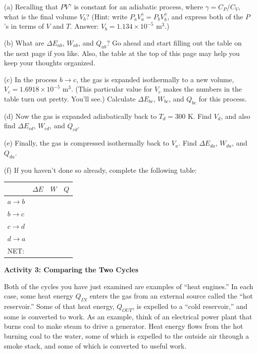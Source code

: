 (a) Recalling that $PV^\gamma$ is constant for an adiabatic process, where $\gamma = C_P / C_V$, what is the final volume $V_b$?  (Hint: write $P_a V_a^\gamma = P_b V_b^\gamma$, and express both of the $P$'s in terms of $V$ and $T$. Answer: $V_b=1.134 \times 10^{-5}$ m$^3$.)  
\answerspace{2.2in}

(b) What are $\Delta E_{ab}$, $W_{ab}$, and $Q_{ab}$?  Go ahead and start filling out the table on the next page if you like.  Also, the table at the top of this page may help you keep your thoughts organized.
\answerspace{1.6in}

\pagebreak
(c) In the process $b \rightarrow c$, the gas is expanded isothermally to a new volume, $V_c=1.6918 \times 10^{-5}$ m$^3$.  (This particular value for $V_c$ makes the numbers in the table turn out pretty.  You'll see.)  Calculate $\Delta E_{bc}$, $W_{bc}$, and $Q_{bc}$ for this process.  
\answerspace{1.6in}

(d) Now the gas is expanded adiabatically back to $T_d=300$ K.  Find $V_d$, and also find  $\Delta E_{cd}$, $W_{cd}$, and $Q_{cd}$.
\answerspace{2.0in}


(e) Finally, the gas is compressed isothermally back to $V_a$.  Find $\Delta E_{da}$, $W_{da}$, and $Q_{da}$.  
\answerspace{1.6in}



(f) If you haven't done so already, complete the following table:
\vspace{0.1 in}

{\renewcommand{\arraystretch}{2.0}
\begin{tabular}{| C{1in} |C{1in} | C{1in} | C{1in} |}
\hline
& $\Delta E$ & $W$ & $Q$ \\ \hline
$a \rightarrow b$ & & & \\ \hline
$b \rightarrow c$ & & & \\ \hline
$c \rightarrow d$ & & & \\ \hline
$d \rightarrow a$ & & & \\
\hhline{|=|=|=|=|}
NET: & & & \\ \hline
\end{tabular}
}

\pagebreak
\textbf{Activity 3: Comparing the Two Cycles}

Both of the cycles you have just examined are examples of ``heat engines.''  In each case, some heat energy $Q_{IN}$ enters the gas from an external source called the ``hot reservoir.''   Some of that heat energy, $Q_{OUT}$, is expelled to a ``cold reservoir,'' and some is converted to work.    As an example, think of an electrical power plant that burns coal to make steam to drive a generator.  Heat energy flows from the hot burning coal to the water, some of which is expelled to the outside air through a smoke stack, and some of which is converted to useful work.

